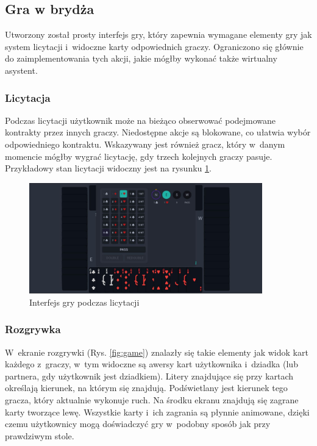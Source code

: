 \subsection{Gra w brydża}

Utworzony został prosty interfejs gry, który zapewnia
wymagane elementy gry jak system licytacji i~widoczne
karty odpowiednich graczy. Ograniczono się głównie do
zaimplementowania tych akcji, jakie mógłby wykonać także
wirtualny asystent.

\subsubsection{Licytacja}

Podczas licytacji użytkownik może na bieżąco obserwować
podejmowane kontrakty przez innych graczy. Niedostępne akcje
są blokowane, co ułatwia wybór odpowiedniego kontraktu.
Wskazywany jest również gracz, który w~danym momencie
mógłby wygrać licytację, gdy trzech kolejnych graczy
pasuje. Przykładowy stan licytacji widoczny jest na rysunku
\ref{fig:bidding}.

\begin{figure}[h!]
  \centering
  \includegraphics[width=0.9\textwidth]{img/widoki/bidding.png}
  \caption{Interfejs gry podczas licytacji}
  \label{fig:bidding}
\end{figure}

\FloatBarrier

\subsubsection{Rozgrywka}

W~ekranie rozgrywki (Rys. \ref{fig:game}) znalazły się takie
elementy jak widok
kart każdego z~graczy, w~tym widoczne są awersy kart
użytkownika i~dziadka (lub partnera, gdy użytkownik jest
dziadkiem). Litery znajdujące się przy kartach określają
kierunek, na którym się znajdują. Podświetlany jest
kierunek tego gracza, który aktualnie wykonuje ruch.
Na środku ekranu znajdują się zagrane karty tworzące lewę.
Wszystkie karty i~ich zagrania są płynnie animowane,
dzięki czemu użytkownicy mogą doświadczyć gry
w~podobny sposób jak przy prawdziwym stole.

